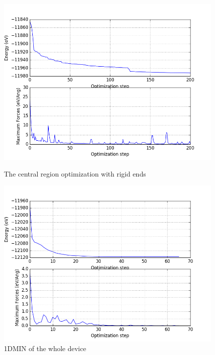\begin{figure}
\begin{minipage}[t]{0.5\linewidth}
\centering
\includegraphics[width=\textwidth]{central.png}
\caption{The central region optimization with rigid ends}
\label{fig:centralop}
\end{minipage}%
\begin{minipage}[t]{0.5\linewidth}
\centering
\includegraphics[width=\textwidth]{1DMIN.png}
\caption{1DMIN of the whole device}
\label{fig:1DMINop}
\end{minipage}
\end{figure}

